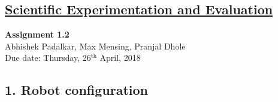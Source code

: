 \documentclass[11pt,a4paper,openright,twoside]{extreport}
\begin{document}
\begin{center}
\section*{\underline{Scientific Experimentation and Evaluation}}

\large{\textbf{Assignment 1.2}}\\
\large{Abhishek Padalkar, Max Mensing, Pranjal Dhole}\\
\large{Due date: Thursday, 26$^{\text{th}}$ April, 2018}
\end{center}

\subsection*{1. Robot configuration}
\label{robot-config}
\end{document}
